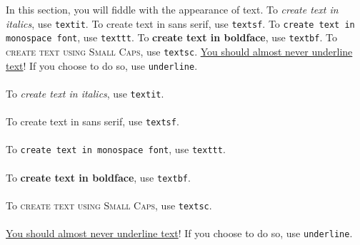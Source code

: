 In this section, you will fiddle with the appearance of text. To \textit{create text in italics}, use \texttt{textit}. To \textsf{create text in sans serif}, use \texttt{textsf}. To \texttt{create text in monospace font}, use \texttt{texttt}. To \textbf{create text in boldface}, use \texttt{textbf}. To \textsc{create text using Small Caps}, use \texttt{textsc}. \underline{You should almost never underline text}! If you choose to do so, use \texttt{underline}.

\begin{sample}
        \paragraph{}To \textit{create text in italics}, use \texttt{textit}. 
        \paragraph{}To \textsf{create text in sans serif}, use \texttt{textsf}. 
        \paragraph{}To \texttt{create text in monospace font}, use \texttt{texttt}. 
        \paragraph{}To \textbf{create text in boldface}, use \texttt{textbf}. 
        \paragraph{}To \textsc{create text using Small Caps}, use \texttt{textsc}. 
        \paragraph{}\underline{You should almost never underline text}! If you choose to do so, use \texttt{underline}.
\end{sample}


